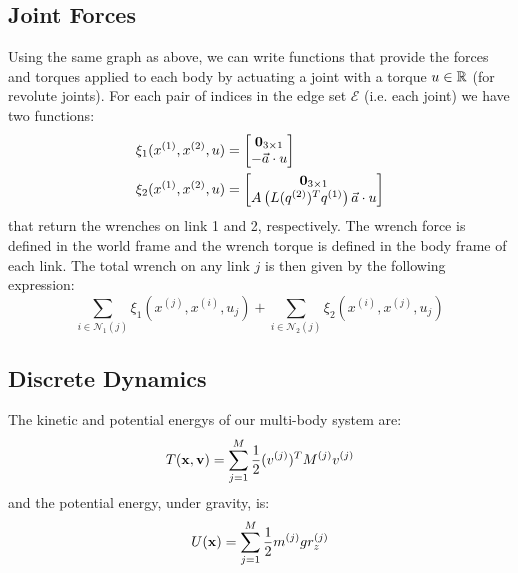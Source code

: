 \documentclass[../root.tex]{subfiles}
\begin{document}
\subsection{Joint Forces}
Using the same graph as above, we can write functions that provide the forces and torques 
applied to each body by actuating a joint with a torque $u \in \mathbb{R}$ (for revolute joints). 
For each pair of indices in the edge set $\mathcal{E}$ (i.e. each joint) we have two 
functions: 
\begin{subequations}
    \begin{align}
    \xi_1(x^{(1)}, x^{(2)}, u) &= \begin{bmatrix}
        \mathbf{0}_{3 \times 1} \\ -\vec{a} \cdot u
    \end{bmatrix} \\
    \xi_2(x^{(1)}, x^{(2)}, u) &= \begin{bmatrix}
        \mathbf{0}_{3 \times 1} \\
        A\left(L(q^{(2)})^T q^{(1)}\right) \vec{a} \cdot u
    \end{bmatrix}
    \end{align} 
\end{subequations}
that return the wrenches on link 1 and 2, respectively. The wrench force is defined in the 
world frame and the wrench torque is defined in the body frame of each link.
The total wrench on any link $j$ is then given by the following expression:
\begin{equation} \label{eq:link_wrench}
    \sum_{i \in \mathcal{N}_1(j)} \xi_1\left(x^{(j)}, x^{(i)}, u_j\right) + 
    \sum_{i \in \mathcal{N}_2(j)} \xi_2\left(x^{(i)}, x^{(j)}, u_j\right)
\end{equation}

\subsection{Discrete Dynamics} \label{sec:discrete_dynamics}
The kinetic and potential energys of our multi-body system are:
\begin{equation}
    T(\mathbf{x},\mathbf{v}) = \sum_{j=1}^M \frac{1}{2} (v^{(j)})^T M^{(j)} v^{(j)}
\end{equation}
and the potential energy, under gravity, is:
\begin{equation}
    U(\mathbf{x}) = \sum_{j=1}^M \frac{1}{2} m^{(j)} g r_z^{(j)}
\end{equation}
\end{document}
